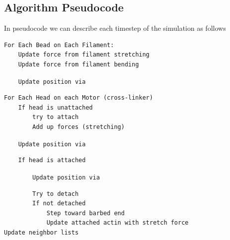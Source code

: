 \documentclass[11pt]{article}
\begin{document}
\subsection{Algorithm Pseudocode}
In pseudocode we can describe each timestep of the simulation as follows
\begin{verbatim}
For Each Bead on Each Filament:
    Update force from filament stretching
    Update force from filament bending\end{verbatim}
\verb|    Update position via | \begin{verbatim}
For Each Head on each Motor (cross-linker)
    If head is unattached
        try to attach
        Add up forces (stretching)\end{verbatim}
\verb|    Update position via | \begin{verbatim}
    If head is attached\end{verbatim}
\verb|        Update position via | \begin{verbatim}
        Try to detach
        If not detached 
            Step toward barbed end
            Update attached actin with stretch force
Update neighbor lists
\end{verbatim}
\end{document}
